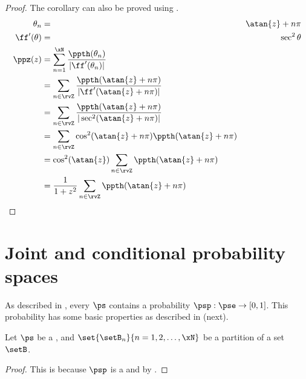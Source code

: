 \begin{proof}
The corollary can also be proved using .
\begin{align*}
  \theta_n &=& \atan{z}+n\pi \\
  \ff'(\theta) &=& \sec^2 \theta    \\
  \ppz(z)
    &= \sum_{n=1}^{\xN} \frac{\ppth(\theta_n)}{|\ff'(\theta_n)|}
  \\&= \sum_{n\in\rvZ}\frac{\ppth(\atan{z}+n\pi)}{|\ff'(\atan{z}+n\pi)|}
  \\&= \sum_{n\in\rvZ}\frac{\ppth(\atan{z}+n\pi)}{|\sec^2(\atan{z}+n\pi)|}
  \\&= \sum_{n\in\rvZ}\cos^2(\atan{z}+n\pi)  \ppth(\atan{z}+n\pi)
  \\&= \cos^2(\atan{z}) \sum_{n\in\rvZ} \ppth(\atan{z}+n\pi)
  \\&= \frac{1}{1+z^2}  \sum_{n\in\rvZ}\ppth(\atan{z}+n\pi)
\end{align*}
\end{proof}

\section{Joint and conditional probability spaces}
As described in ,
every  $\ps$ contains a probability  $\psp:\pse\to[0,1]$.
This probability  has some basic properties as described in
 (next).
\begin{theorem}
\label{thm:P}
Let $\ps$ be a ,
and $\set{\setB_n}{n=1,2,\ldots,\xN}$ be a partition of a set $\setB$.
\end{theorem}
\begin{proof}
This is because $\psp$ is a  and by .
\end{proof}



